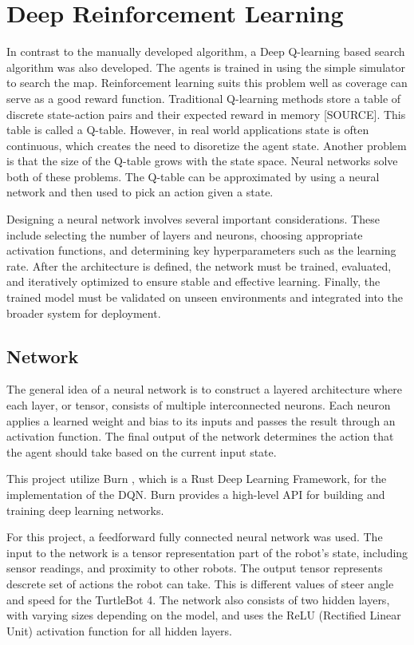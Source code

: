 \section{Deep Reinforcement Learning}
In contrast to the manually developed algorithm, a Deep Q-learning based search algorithm was also developed. The agents is trained in using the simple simulator to search the map. Reinforcement learning suits this problem well as coverage can serve as a {\color{red} good} reward function. Traditional Q-learning methods store a table of discrete state-action pairs and their expected reward in memory {\color{red}[SOURCE]}. This table is called a Q-table. However, in real world applications state is often continuous, which creates the need to {\color{red} disoretize} the agent state. Another problem is that the size of the Q-table grows with the state space. Neural networks solve both of these problems. The Q-table can be approximated by using a neural network and then used to pick an action given a state.

Designing a neural network involves several important considerations. These include selecting the number of layers and neurons, choosing appropriate activation functions, and determining key hyperparameters such as the learning rate. After the architecture is defined, the network must be trained, evaluated, and iteratively optimized to ensure stable and effective learning. Finally, the trained model must be validated on unseen environments and integrated into the broader system for deployment.

\subsection{Network}
The general idea of a neural network is to construct a layered architecture where each layer, or tensor, consists of multiple interconnected neurons. Each neuron applies a learned weight and bias to its inputs and passes the result through an activation function. The final output of the network determines the action that the agent should take based on the current input state.

This project utilize Burn \cite{burn}, which is a Rust Deep Learning Framework, for the implementation of the DQN. Burn provides a high-level API for building and training deep learning networks.

For this project, a feedforward fully connected neural network was used. The input to the network is a tensor representation part of the robot’s state, including sensor readings, and proximity to other robots. 
The output tensor represents descrete set of actions the robot can take. This is different values of steer angle and speed for the TurtleBot 4.
The network also consists of two hidden layers, with varying sizes depending on the model, and uses the ReLU (Rectified Linear Unit) activation function for all hidden layers.

